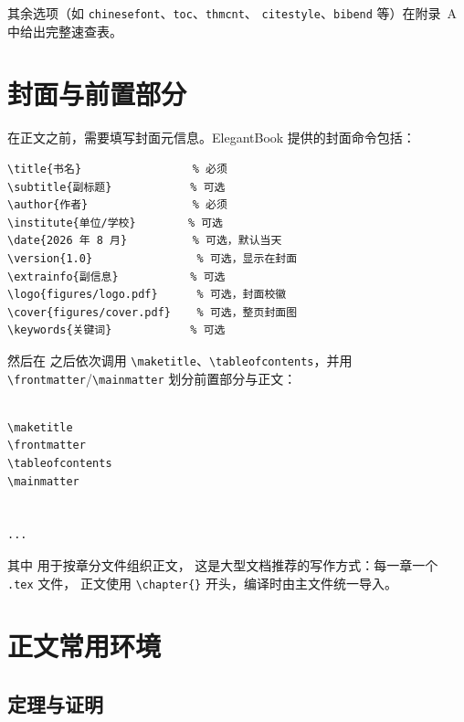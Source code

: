 其余选项（如 \texttt{chinesefont}、\texttt{toc}、\texttt{thmcnt}、
\texttt{citestyle}、\texttt{bibend} 等）在附录~A 中给出完整速查表。

\section{封面与前置部分}

在正文之前，需要填写封面元信息。ElegantBook 提供的封面命令包括：

\begin{lstlisting}
\title{书名}                 % 必须
\subtitle{副标题}            % 可选
\author{作者}                % 必须
\institute{单位/学校}        % 可选
\date{2026 年 8 月}          % 可选，默认当天
\version{1.0}                % 可选，显示在封面
\extrainfo{副信息}           % 可选
\logo{figures/logo.pdf}      % 可选，封面校徽
\cover{figures/cover.pdf}    % 可选，整页封面图
\keywords{关键词}            % 可选
\end{lstlisting}

然后在 \verb|| 之后依次调用
\verb|\maketitle|、\verb|\tableofcontents|，并用
\verb|\frontmatter|/\verb|\mainmatter| 划分前置部分与正文：

\begin{lstlisting}

\maketitle
\frontmatter
\tableofcontents
\mainmatter


...

\end{lstlisting}

其中 \verb|| 用于按章分文件组织正文，
这是大型文档推荐的写作方式：每一章一个 \texttt{.tex} 文件，
正文使用 \verb|\chapter{}| 开头，编译时由主文件统一导入。

\section{正文常用环境}

\subsection{定理与证明}

